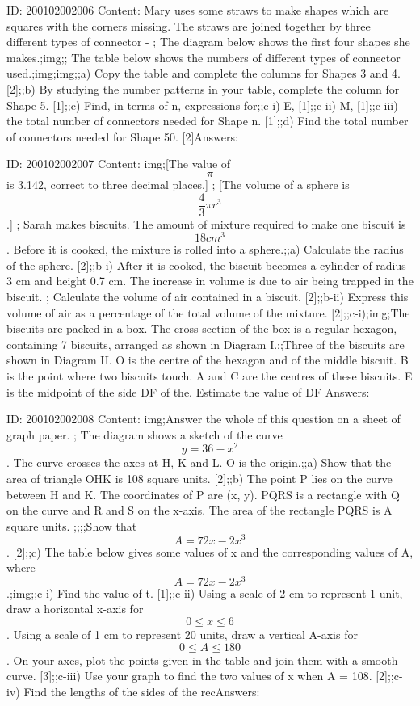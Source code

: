 \documentclass{article}
\begin{document}
ID: 200102002006
Content:
Mary uses some straws to make shapes which are squares with the corners missing. The straws are joined together by three different types of connector - ; The diagram below shows the first four shapes she makes.;img;; The table below shows the numbers of different types of connector used.;img;img;;a) Copy the table and complete the columns for Shapes 3 and 4. [2];;b) By studying the number patterns in your table, complete the column for Shape 5. [1];;c) Find, in terms of n, expressions for;;c-i) E, [1];;c-ii) M, [1];;c-iii) the total number of connectors needed for Shape n. [1];;d) Find the total number of connectors needed for Shape 50. [2]Answers:

ID: 200102002007
Content:
img;[The value of $$\pi$$ is 3.142, correct to three decimal places.] ; [The volume of a sphere is $$\frac{4}{3}\pi r^{3} $$.] ; Sarah makes biscuits. The amount of mixture required to make one biscuit is $$18cm^{3} $$. Before it is cooked, the mixture is rolled into a sphere.;;a) Calculate the radius of the sphere. [2];;b-i) After it is cooked, the biscuit becomes a cylinder of radius 3 cm and height 0.7 cm. The increase in volume is due to air being trapped in the biscuit. ; Calculate the volume of air contained in a biscuit. [2];;b-ii) Express this volume of air as a percentage of the total volume of the mixture. [2];;c-i);img;The biscuits are packed in a box. The cross-section of the box is a regular hexagon, containing 7 biscuits, arranged as shown in Diagram I.;;Three of the biscuits are shown in Diagram II. O is the centre of the hexagon and of the middle biscuit. B is the point where two biscuits touch. A and C are the centres of these biscuits. E is the midpoint of the side DF of the. Estimate the value of DF Answers:

ID: 200102002008
Content:
img;Answer the whole of this question on a sheet of graph paper. ; The diagram shows a sketch of the curve $$y=36-x^{2} $$. The curve crosses the axes at H, K and L. O is the origin.;;a) Show that the area of triangle OHK is 108 square units. [2];;b) The point P lies on the curve between H and K. The coordinates of P are (x, y). PQRS is a rectangle with Q on the curve and R and S on the x-axis. The area of the rectangle PQRS is A square units. ;;;;Show that $$A=72x-2x^{3} $$. [2];;c) The table below gives some values of x and the corresponding values of A, where $$A=72x-2x^{3} $$.;img;;c-i) Find the value of t. [1];;c-ii) Using a scale of 2 cm to represent 1 unit, draw a horizontal x-axis for $$0\leq x\leq 6$$. Using a scale of 1 cm to represent 20 units, draw a vertical A-axis for $$0\leq A\leq 180$$. On your axes, plot the points given in the table and join them with a smooth curve. [3];;c-iii) Use your graph to find the two values of x when A = 108. [2];;c-iv) Find the lengths of the sides of the recAnswers:
\end{document}
